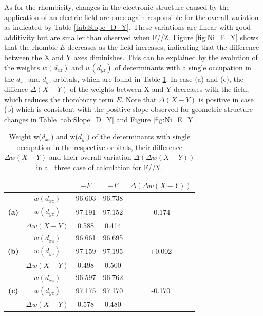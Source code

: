 \documentclass[10pt]{report}
\numberwithin{equation}{section}
\begin{document}
As for the rhombicity, changes in the electronic structure caused by the application of an electric field are once again responsible for the overall variation as indicated by Table \ref{tab:Slope_D_Y}.
These variations are linear with good additivity but are smaller than observed when F//Z. 
Figure \ref{fig:Ni_E_Y} shows that the rhombic $E$ decreases as the field increases, indicating that the difference between the X and Y axes diminishes.
This can be explained by the evolution of the weights $w(d_{xz})$ and $w(d_{yz})$ of determinants with a single occupation in the $d_{xz}$ and $d_{yz}$ orbitals, which are found in Table \ref{tab:PoidsY}.
In case (a) and (c), the diffence $\Delta (X-Y)$ of the weights between X and Y decreases with the field, which reduces the rhombicity term $E$.
Note that $\Delta (X-Y)$ is positive in case (b) which is consistent with the positive slope observed for geometric structure changes in Table \ref{tab:Slope_D_Y} and Figure \ref{fig:Ni_E_Y}.


\begin{table}[h]
    \centering
    \begin{tabular}{c | c | c c | c }
        & &  $-F$ & $-F$ & $\Delta (\Delta w(X-Y))$\\
        \hline
        \multirow{3}{*}{\textbf{(a)}}
        &$w(d_{xz})$ &  96.603 & 96.738 & \\
        &$w(d_{yz})$ &  97.191 & 97.152 & -0.174\\
        &$\Delta w(X-Y)$ & 0.588 & 0.414& \\
        \hline
        \multirow{3}{*}{\textbf{(b)}}
        &$w(d_{xz})$ &  96.661 & 96.695 & \\
        &$w(d_{yz})$ &  97.159 & 97.195 & +0.002\\
        &$\Delta w(X-Y)$ & 0.498 & 0.500& \\
        \hline
        \multirow{3}{*}{\textbf{(c)}}
        &$w(d_{xz})$ &  96.597 & 96.762 & \\
        &$w(d_{yz})$ &  97.175 & 97.170 & -0.170\\
        &$\Delta w(X-Y)$ & 0.578 & 0.480& \\
        \hline
    \end{tabular}
    \caption{Weight w($d_{xz}$) and w($d_{yz})$ of the determinants with single occupation in the respective orbitals, their difference $\Delta w(X-Y)$ and their overall variation $\Delta (\Delta w(X-Y))$ in all three case of calculation for F//Y.}
    \label{tab:PoidsY}
\end{table}
\end{document}
